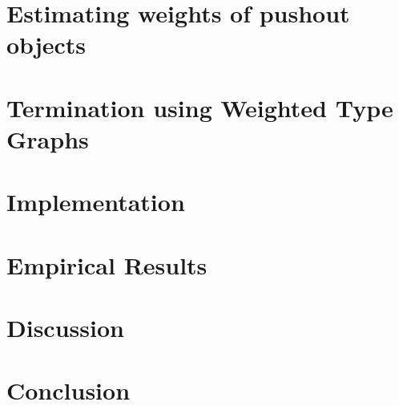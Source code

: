 \documentclass{report}
\begin{document}
\section{Estimating weights of pushout objects} 
\label{sec:type_graph:weighing_pushout} 
  

\section{Termination using Weighted Type Graphs}
\label{sec:type_graph:termination}
   
  
% 

\section{Implementation}
\label{sec:type_graph:implementation}
 


%  

\section{Empirical Results}
\label{sec:type_graph:result}
 

\section{Discussion}
\label{sec:type_graph:related_work}


\section{Conclusion}
\label{sec:type_graph:conclusion}


\end{document}
